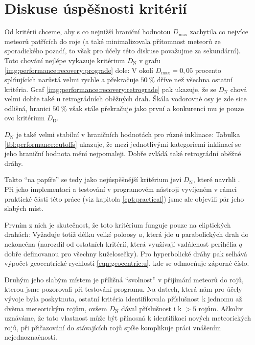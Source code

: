 \section{Diskuse úspěšnosti kritérií}%
Od kritérií chceme, aby s co nejnižší hraniční hodnotou $D_\text{max}$ zachytila co nejvíce meteorů patřících do roje (a také minimalizovala přítomnost meteorů ze sporadického pozadí, to však pro účely této diskuse považujme za sekundární). Toto chování nejlépe vykazuje kritérium $D_\text{N}$ v grafu \ref{img:performance:recovery:prograde} dole: V okolí $D_\text{max}=0{,}05$ procento splňujících narůstá velmi rychle a překračuje $50\:\%$ dříve než všechna ostatní kritéria. Graf \ref{img:performance:recovery:retrograde} pak ukazuje, že se $D_\text{N}$ chová velmi dobře také u retrográdních oběžných drah. Škála vodorovné osy je zde sice odlišná, hranici $50\:\%$ však stále překračuje jako první a konkurencí mu je pouze \citeauthor{cometassoc}ovo kritérium $D_\text{D}$.

$D_\text{N}$ je také velmi stabilní v hraničních hodnotách pro různé inklinace: Tabulka \ref{tbl:performance:cutoffs} ukazuje, že mezi jednotlivými kategoriemi inklinací se jeho hraniční hodnota mění nejpomaleji. Dobře zvládá také retrográdní oběžné dráhy.

\smallskip

Takto "`na papíře"' se tedy jako nejúspěšnější kritérium jeví $D_\text{N}$, které navrhli \citeauthor{newapproach}. Při jeho implementaci a testování v programovém nástroji vyvíjeném v rámci praktické části této práce (viz kapitola \ref{cpt:practical}) jsme ale objevili pár jeho slabých míst.

Prvním z nich je skutečnost, že toto kritérium funguje pouze na eliptických drahách: Vyžaduje totiž délku velké poloosy $a$, která jde u parabolických drah do nekonečna (narozdíl od ostatních kritérií, která využívají vzdálenost perihélia $q$ dobře definovanou pro všechny kuželosečky). Pro hyperbolické dráhy pak selhává výpočet geocentrické rychlosti \eqref{eqn:geocentric:u}, kde se odmocňuje záporné číslo.

Druhým jeho slabým místem je přílišná "`svolnost"' v přijímání meteorů do rojů, kterou jsme pozorovali při testování programu. Na datech, která nám pro účely vývoje byla poskytnuta, ostatní kritéria identifikovala příslušnost k jednomu až dvěma meteorickým rojům, ovšem $D_\text{N}$ dával příslušnost i k $>5$ rojům. Ačkoliv uznáváme, že tato vlastnost může být přínosná k identifikaci nových meteorických rojů, při přiřazování do stávajících rojů spíše komplikuje práci vnášením nejednoznačnosti.


